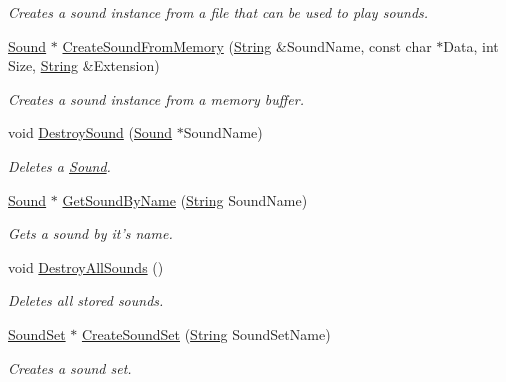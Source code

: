 \begin{DoxyCompactItemize}
\begin{DoxyCompactList}\small\item\em Creates a sound instance from a file that can be used to play sounds. \item\end{DoxyCompactList}\item 
\hyperlink{classphys_1_1Sound}{Sound} $\ast$ \hyperlink{classphys_1_1SoundManager_aa039c3d7a5ee961be0934a58fd3826fa}{CreateSoundFromMemory} (\hyperlink{namespacephys_aa03900411993de7fbfec4789bc1d392e}{String} \&SoundName, const char $\ast$Data, int Size, \hyperlink{namespacephys_aa03900411993de7fbfec4789bc1d392e}{String} \&Extension)
\begin{DoxyCompactList}\small\item\em Creates a sound instance from a memory buffer. \item\end{DoxyCompactList}\item 
void \hyperlink{classphys_1_1SoundManager_a6a996829cab647ccf1ca401361af7167}{DestroySound} (\hyperlink{classphys_1_1Sound}{Sound} $\ast$SoundName)
\begin{DoxyCompactList}\small\item\em Deletes a \hyperlink{classphys_1_1Sound}{Sound}. \item\end{DoxyCompactList}\item 
\hyperlink{classphys_1_1Sound}{Sound} $\ast$ \hyperlink{classphys_1_1SoundManager_aa325440a688757ad74812b7f093e2423}{GetSoundByName} (\hyperlink{namespacephys_aa03900411993de7fbfec4789bc1d392e}{String} SoundName)
\begin{DoxyCompactList}\small\item\em Gets a sound by it's name. \item\end{DoxyCompactList}\item 
void \hyperlink{classphys_1_1SoundManager_a0f523240530abd5ab437c9eace78056a}{DestroyAllSounds} ()
\begin{DoxyCompactList}\small\item\em Deletes all stored sounds. \item\end{DoxyCompactList}\item 
\hyperlink{classphys_1_1SoundSet}{SoundSet} $\ast$ \hyperlink{classphys_1_1SoundManager_afccb11a6f6d9aa9768a185febb0af45a}{CreateSoundSet} (\hyperlink{namespacephys_aa03900411993de7fbfec4789bc1d392e}{String} SoundSetName)
\begin{DoxyCompactList}\small\item\em Creates a sound set. \item\end{DoxyCompactList}\item 

\end{DoxyCompactItemize}
